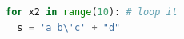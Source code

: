 \documentclass{article}
\begin{document}
\begin{lstlisting}[language=Python]
for x2 in range(10): # loop it
  s = 'a b\'c' + "d"
\end{lstlisting}
\end{document}
